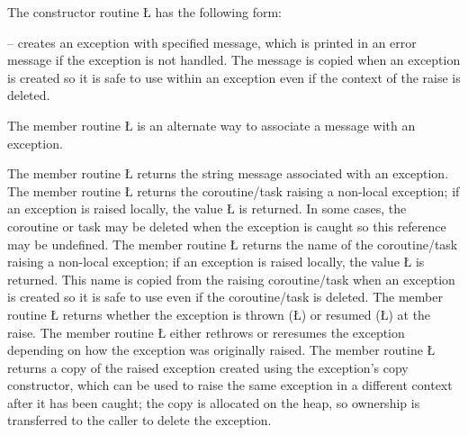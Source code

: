 \documentclass[openright,twoside]{report}
\begin{document}
The constructor routine \LGinlinetrue\LGbegin\lgrinde\L{}\endlgrinde\LGend{} has the following form:
\begin{prefix}
\item[\LGinlinetrue\LGbegin\lgrinde\L{\LB{\Proc{uBaseEvent}\V{uBaseEvent}(\0\K{const}\0\K{char}\0\*\0\K{const}\0\V{msg}\0=\0\S{}\"\"\SE{}\0)}}\endlgrinde\LGend{}]
-- creates an exception with specified message, which is printed in an error message if the exception is not handled.
The message is copied when an exception is created so it is safe to use within an exception even if the context of the raise is deleted.
\end{prefix}
The member routine \LGinlinetrue\LGbegin\lgrinde\L{}\endlgrinde\LGend{} is an alternate way to associate a message with an exception.

The member routine \LGinlinetrue\LGbegin\lgrinde\L{}\endlgrinde\LGend{} returns the string message associated with an exception.
The member routine \LGinlinetrue\LGbegin\lgrinde\L{}\endlgrinde\LGend{} returns the coroutine/task raising a non-local exception;
if an exception is raised locally, the value \LGinlinetrue\LGbegin\lgrinde\L{}\endlgrinde\LGend{} is returned.
In some cases, the coroutine or task may be deleted when the exception is caught so this reference may be undefined.
The member routine \LGinlinetrue\LGbegin\lgrinde\L{}\endlgrinde\LGend{} returns the name of the coroutine/task raising a non-local exception;
if an exception is raised locally, the value \LGinlinetrue\LGbegin\lgrinde\L{}\endlgrinde\LGend{} is returned.
This name is copied from the raising coroutine/task when an exception is created so it is safe to use even if the coroutine/task is deleted.
The member routine \LGinlinetrue\LGbegin\lgrinde\L{}\endlgrinde\LGend{} returns whether the exception is thrown (\LGinlinetrue\LGbegin\lgrinde\L{}\endlgrinde\LGend{}) or resumed (\LGinlinetrue\LGbegin\lgrinde\L{}\endlgrinde\LGend{}) at the raise.
The member routine \LGinlinetrue\LGbegin\lgrinde\L{}\endlgrinde\LGend{} either rethrows or reresumes the exception depending on how the exception was originally raised.
The member routine \LGinlinetrue\LGbegin\lgrinde\L{}\endlgrinde\LGend{} returns a copy of the raised exception created using the exception's copy constructor, which can be used to raise the same exception in a different context after it has been caught;
the copy is allocated on the heap, so ownership is transferred to the caller to delete the exception.
\end{document}
